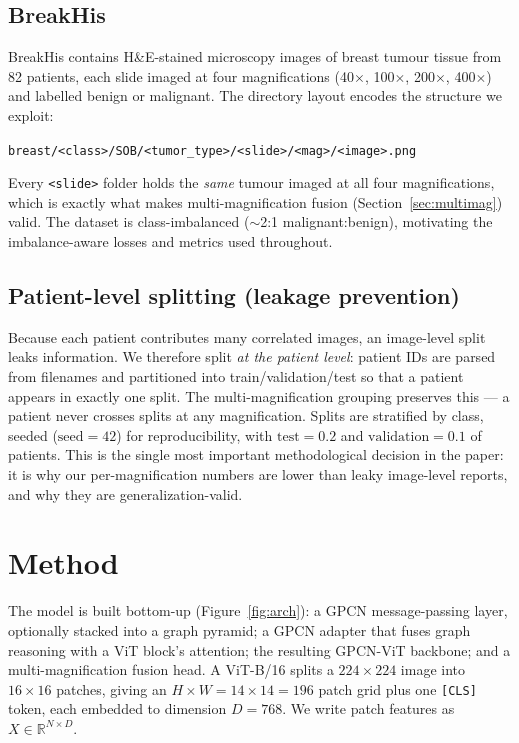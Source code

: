 \documentclass[11pt]{article}
\newcommand{\cls}{\texttt{[CLS]}}
\begin{document}
\subsection{BreakHis}
BreakHis contains H\&E-stained microscopy images of breast tumour tissue from 82
patients, each slide imaged at four magnifications (40$\times$, 100$\times$,
200$\times$, 400$\times$) and labelled benign or malignant. The directory layout
encodes the structure we exploit:
\begin{center}\small
\texttt{breast/<class>/SOB/<tumor\_type>/<slide>/<mag>/<image>.png}
\end{center}
Every \texttt{<slide>} folder holds the \emph{same} tumour imaged at all four
magnifications, which is exactly what makes multi-magnification fusion
(Section~\ref{sec:multimag}) valid. The dataset is class-imbalanced
($\sim$2:1 malignant:benign), motivating the imbalance-aware losses and metrics
used throughout.

\subsection{Patient-level splitting (leakage prevention)}
\label{sec:split}
Because each patient contributes many correlated images, an image-level split
leaks information. We therefore split \emph{at the patient level}: patient IDs are
parsed from filenames and partitioned into train/validation/test so that a patient
appears in exactly one split. The multi-magnification grouping preserves this — a
patient never crosses splits at any magnification. Splits are stratified by class,
seeded ($\text{seed}=42$) for reproducibility, with $\text{test}=0.2$ and
$\text{validation}=0.1$ of patients. This is the single most important
methodological decision in the paper: it is why our per-magnification numbers are
lower than leaky image-level reports, and why they are generalization-valid.

\section{Method}
\label{sec:method}

The model is built bottom-up (Figure~\ref{fig:arch}): a GPCN message-passing layer,
optionally stacked into a graph pyramid; a GPCN adapter that fuses graph reasoning
with a ViT block's attention; the resulting GPCN-ViT backbone; and a
multi-magnification fusion head. A ViT-B/16 splits a $224\times224$ image into
$16\times16$ patches, giving an $H\times W = 14\times14 = 196$ patch grid plus one
\cls{} token, each embedded to dimension $D=768$. We write patch features as
$X\in\mathbb{R}^{N\times D}$.
\end{document}
